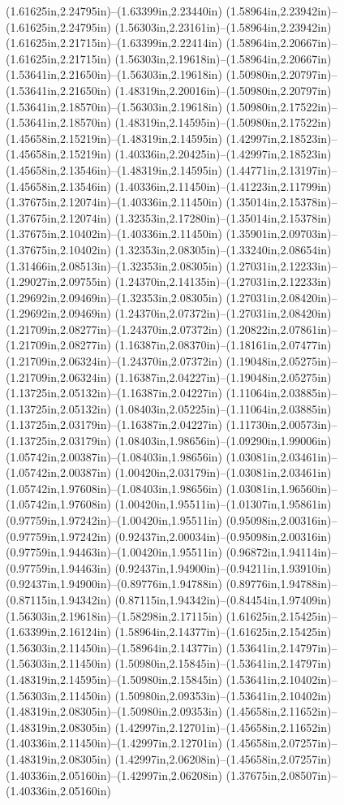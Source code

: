 (1.61625in,2.24795in)--(1.63399in,2.23440in) (1.58964in,2.23942in)--(1.61625in,2.24795in) (1.56303in,2.23161in)--(1.58964in,2.23942in) (1.61625in,2.21715in)--(1.63399in,2.22414in) (1.58964in,2.20667in)--(1.61625in,2.21715in) (1.56303in,2.19618in)--(1.58964in,2.20667in) (1.53641in,2.21650in)--(1.56303in,2.19618in) (1.50980in,2.20797in)--(1.53641in,2.21650in) (1.48319in,2.20016in)--(1.50980in,2.20797in) (1.53641in,2.18570in)--(1.56303in,2.19618in) (1.50980in,2.17522in)--(1.53641in,2.18570in) (1.48319in,2.14595in)--(1.50980in,2.17522in) (1.45658in,2.15219in)--(1.48319in,2.14595in) (1.42997in,2.18523in)--(1.45658in,2.15219in) (1.40336in,2.20425in)--(1.42997in,2.18523in) (1.45658in,2.13546in)--(1.48319in,2.14595in) (1.44771in,2.13197in)--(1.45658in,2.13546in) (1.40336in,2.11450in)--(1.41223in,2.11799in) (1.37675in,2.12074in)--(1.40336in,2.11450in) (1.35014in,2.15378in)--(1.37675in,2.12074in) (1.32353in,2.17280in)--(1.35014in,2.15378in) (1.37675in,2.10402in)--(1.40336in,2.11450in) (1.35901in,2.09703in)--(1.37675in,2.10402in) (1.32353in,2.08305in)--(1.33240in,2.08654in) (1.31466in,2.08513in)--(1.32353in,2.08305in) (1.27031in,2.12233in)--(1.29027in,2.09755in) (1.24370in,2.14135in)--(1.27031in,2.12233in) (1.29692in,2.09469in)--(1.32353in,2.08305in) (1.27031in,2.08420in)--(1.29692in,2.09469in) (1.24370in,2.07372in)--(1.27031in,2.08420in) (1.21709in,2.08277in)--(1.24370in,2.07372in) (1.20822in,2.07861in)--(1.21709in,2.08277in) (1.16387in,2.08370in)--(1.18161in,2.07477in) (1.21709in,2.06324in)--(1.24370in,2.07372in) (1.19048in,2.05275in)--(1.21709in,2.06324in) (1.16387in,2.04227in)--(1.19048in,2.05275in) (1.13725in,2.05132in)--(1.16387in,2.04227in) (1.11064in,2.03885in)--(1.13725in,2.05132in) (1.08403in,2.05225in)--(1.11064in,2.03885in) (1.13725in,2.03179in)--(1.16387in,2.04227in) (1.11730in,2.00573in)--(1.13725in,2.03179in) (1.08403in,1.98656in)--(1.09290in,1.99006in) (1.05742in,2.00387in)--(1.08403in,1.98656in) (1.03081in,2.03461in)--(1.05742in,2.00387in) (1.00420in,2.03179in)--(1.03081in,2.03461in) (1.05742in,1.97608in)--(1.08403in,1.98656in) (1.03081in,1.96560in)--(1.05742in,1.97608in) (1.00420in,1.95511in)--(1.01307in,1.95861in) (0.97759in,1.97242in)--(1.00420in,1.95511in) (0.95098in,2.00316in)--(0.97759in,1.97242in) (0.92437in,2.00034in)--(0.95098in,2.00316in) (0.97759in,1.94463in)--(1.00420in,1.95511in) (0.96872in,1.94114in)--(0.97759in,1.94463in) (0.92437in,1.94900in)--(0.94211in,1.93910in) (0.92437in,1.94900in)--(0.89776in,1.94788in) (0.89776in,1.94788in)--(0.87115in,1.94342in) (0.87115in,1.94342in)--(0.84454in,1.97409in) (1.56303in,2.19618in)--(1.58298in,2.17115in) (1.61625in,2.15425in)--(1.63399in,2.16124in) (1.58964in,2.14377in)--(1.61625in,2.15425in) (1.56303in,2.11450in)--(1.58964in,2.14377in) (1.53641in,2.14797in)--(1.56303in,2.11450in) (1.50980in,2.15845in)--(1.53641in,2.14797in) (1.48319in,2.14595in)--(1.50980in,2.15845in) (1.53641in,2.10402in)--(1.56303in,2.11450in) (1.50980in,2.09353in)--(1.53641in,2.10402in) (1.48319in,2.08305in)--(1.50980in,2.09353in) (1.45658in,2.11652in)--(1.48319in,2.08305in) (1.42997in,2.12701in)--(1.45658in,2.11652in) (1.40336in,2.11450in)--(1.42997in,2.12701in) (1.45658in,2.07257in)--(1.48319in,2.08305in) (1.42997in,2.06208in)--(1.45658in,2.07257in) (1.40336in,2.05160in)--(1.42997in,2.06208in) (1.37675in,2.08507in)--(1.40336in,2.05160in) 